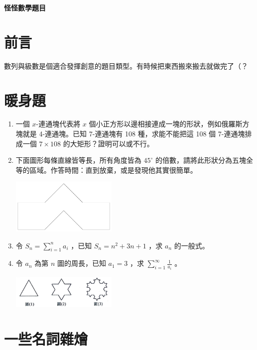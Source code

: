 \documentclass[12pt]{article}
\newcommand{\testtitle}[1]{ \begin{center}{\large\bf #1}\end{center} }
\begin{document}
\testtitle{怪怪數學題目}

\section{前言}

數列與級數是個適合發揮創意的題目類型。有時候把東西搬來搬去就做完了（？

\section{暖身題}

\begin{enumerate}
	\item 一個 $x$-連通塊代表將 $x$ 個小正方形以邊相接連成一塊的形狀，例如俄羅斯方塊就是 4-連通塊。已知 7-連通塊有 108 種，求能不能把這 108 個 7-連通塊排成一個 $7 \times 108$ 的大矩形？證明可以或不行。
		\vspace{10mm}
	\item 下面圖形每條直線皆等長，所有角度皆為 $45^\circ$ 的倍數，請將此形狀分為五塊全等的區域。作答時間：直到放棄，或是發現他其實很簡單。
		\begin{center} \includegraphics[width=0.4\textwidth]{a.pdf} \end{center}
		\vspace{10mm}
	\item 令 $S_n = \sum _ {i = 1} ^{n} {a_i}$ ，已知 $S_n = n^2 + 3n + 1$ ，求 $a_n$ 的一般式。
		\vspace{10mm}
	\item 令 $a_n$ 為第 $n$ 圖的周長，已知 $a_1 = 3$ ，求 $\sum _{i=1} ^{\infty} \frac{1}{a_i}$ 。
		\begin{center} \includegraphics[width=0.4\textwidth]{EE0808.png} \end{center}
		\vspace{10mm}
\end{enumerate}

\section{一些名詞雜燴}
\end{document}
